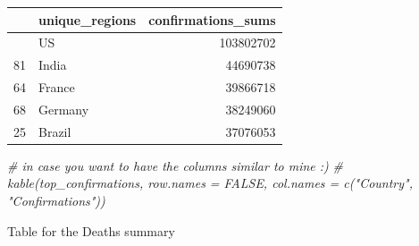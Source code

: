 \documentclass[
]{article}
\newenvironment{Shaded}{\begin{snugshade}}{\end{snugshade}}
\newcommand{\CommentTok}[1]{\textcolor[rgb]{0.56,0.35,0.01}{\textit{#1}}}
\begin{document}
\begin{longtable}[]{@{}llr@{}}
\toprule\noalign{}
& unique\_regions & confirmations\_sums \\
\midrule\noalign{}
\endhead
\bottomrule\noalign{}
\endlastfoot
187 & US & 103802702 \\
81 & India & 44690738 \\
64 & France & 39866718 \\
68 & Germany & 38249060 \\
25 & Brazil & 37076053 \\
\end{longtable}

\begin{Shaded}
\begin{Highlighting}[]
\CommentTok{\# in case you want to have the columns similar to mine :)}
\CommentTok{\# kable(top\_confirmations, row.names = FALSE, col.names = c("Country", "Confirmations"))}
\end{Highlighting}
\end{Shaded}

Table for the Deaths summary
\end{document}
